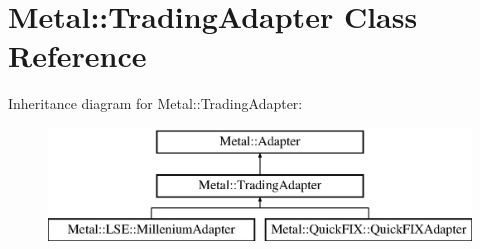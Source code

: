 \hypertarget{classMetal_1_1TradingAdapter}{}\section{Metal\+:\+:Trading\+Adapter Class Reference}
\label{classMetal_1_1TradingAdapter}
Inheritance diagram for Metal\+:\+:Trading\+Adapter\+:\begin{figure}[H]
\begin{center}
\leavevmode
\includegraphics[height=3.000000cm]{classMetal_1_1TradingAdapter}
\end{center}
\end{figure}
